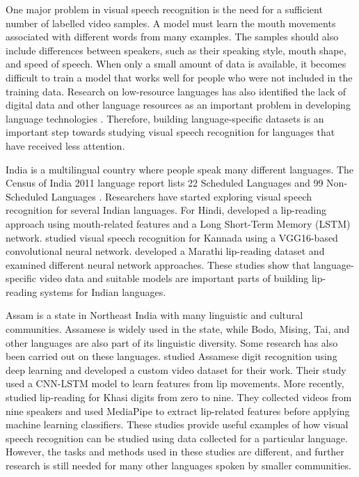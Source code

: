 \documentclass[journal]{IEEEtran}
\begin{document}
One major problem in visual speech recognition is the need for a sufficient number of labelled video samples. A model must learn the mouth movements associated with different words from many examples. The samples should also include differences between speakers, such as their speaking style, mouth shape, and speed of speech. When only a small amount of data is available, it becomes difficult to train a model that works well for people who were not included in the training data. Research on low-resource languages has also identified the lack of digital data and other language resources as an important problem in developing language technologies \cite{magueresse2020low}. Therefore, building language-specific datasets is an important step towards studying visual speech recognition for languages that have received less attention.

India is a multilingual country where people speak many different languages. The Census of India 2011 language report lists 22 Scheduled Languages and 99 Non-Scheduled Languages \cite{census2011language}. Researchers have started exploring visual speech recognition for several Indian languages. For Hindi, \cite{patil2019hindi} developed a lip-reading approach using mouth-related features and a Long Short-Term Memory (LSTM) network. \cite{rudregowda2023kannada} studied visual speech recognition for Kannada using a VGG16-based convolutional neural network. \cite{kulkarni2024marathi} developed a Marathi lip-reading dataset and examined different neural network approaches. These studies show that language-specific video data and suitable models are important parts of building lip-reading systems for Indian languages.

Assam is a state in Northeast India with many linguistic and cultural communities. Assamese is widely used in the state, while Bodo, Mising, Tai, and other languages are also part of its linguistic diversity. Some research has also been carried out on these languages. \cite{prasad2025analysis} studied Assamese digit recognition using deep learning and developed a custom video dataset for their work. Their study used a CNN-LSTM model to learn features from lip movements. More recently, \cite{lyngdoh2026khasi} studied lip-reading for Khasi digits from zero to nine. They collected videos from nine speakers and used MediaPipe to extract lip-related features before applying machine learning classifiers. These studies provide useful examples of how visual speech recognition can be studied using data collected for a particular language. However, the tasks and methods used in these studies are different, and further research is still needed for many other languages spoken by smaller communities.
\end{document}
